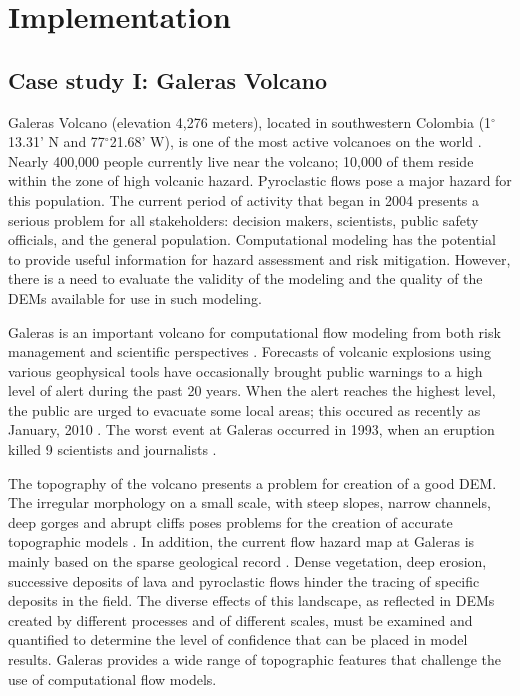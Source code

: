 \documentclass[12pt]{article}
\newcommand{\Deg}{$^{\circ}$}
\begin{document}
\section{Implementation}
\subsection{Case study I: Galeras Volcano}

Galeras Volcano (elevation 4,276 meters), located in southwestern
Colombia (1\Deg 13.31' N and 77\Deg 21.68' W), is one of the most
active volcanoes on the world \citep{hurtado_1997}. Nearly 400,000
people currently live near the volcano; 10,000 of them reside within
the zone of high volcanic hazard. Pyroclastic flows pose a major
hazard for this population. The current period of activity that began
in 2004 \citep{Smith_Galeras} presents a serious problem for all stakeholders: decision
makers, scientists, public safety officials, and the general
population.  Computational modeling has the potential to provide
useful information for hazard assessment and risk mitigation.
However, there is a need to evaluate the validity of the modeling and
the quality of the DEMs available for use in such modeling.

Galeras is an important volcano for computational flow modeling from
both risk management and scientific perspectives
\citep{calvache1997}. Forecasts of volcanic explosions using various
geophysical tools \citep{narvaez_1997} have occasionally brought
public warnings to a high level of alert during the past 20
years. When the alert reaches the highest level, the public are urged
to evacuate some local areas; this occured as recently as January,
2010 \citep{stefanescu3, Smith_Galeras}. The worst event at Galeras occurred in 1993, when an eruption
killed 9 scientists and journalists \citep{baxter1997}.

The topography of the volcano presents a problem for creation of a
good DEM. The irregular morphology on a small scale, with steep
slopes, narrow channels, deep gorges and abrupt cliffs poses problems
for the creation of accurate topographic models
\citep{ordones_2000}. In addition, the current flow hazard map at
Galeras is mainly based on the sparse geological record
\citep{calvache_1990a}. Dense vegetation, deep erosion, successive
deposits of lava and pyroclastic flows hinder the tracing of specific
deposits in the field. The diverse effects of this landscape, as
reflected in DEMs created by different processes and of different
scales, must be examined and quantified to determine the level of
confidence that can be placed in model results. Galeras provides a
wide range of topographic features that challenge the use of
computational flow models.
\end{document}
